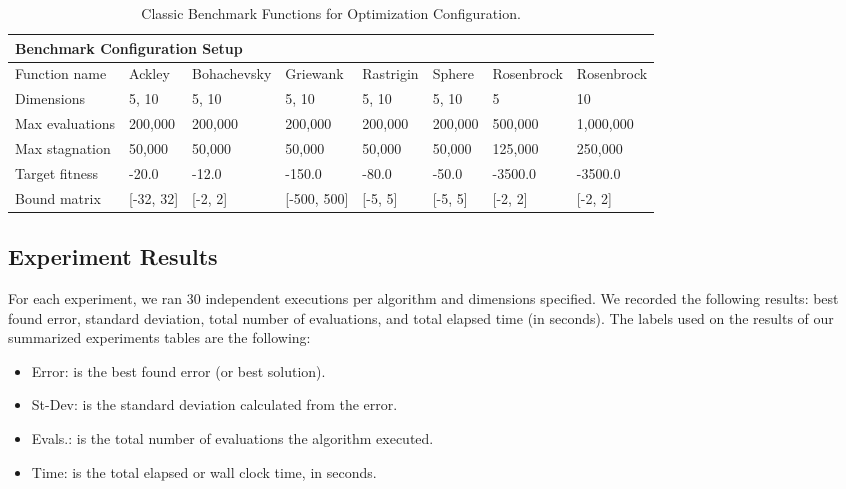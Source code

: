 \documentclass[graybox]{svmult}
\begin{document}
        \begin{table}[]
            \scriptsize
            \centering
            \caption{Classic Benchmark Functions for Optimization Configuration.}\label{tab.benchmark_fun_config}
            \begin{tabular}{@{}llllllll@{}}
            \toprule
            \multicolumn{8}{l}{\textbf{Benchmark Configuration Setup}} \\ \midrule
            Function name & Ackley & Bohachevsky & Griewank & Rastrigin & Sphere & Rosenbrock & Rosenbrock \\
            Dimensions & 5, 10 & 5, 10 & 5, 10 & 5, 10 & 5, 10 & 5 & 10 \\
            Max evaluations & 200,000 & 200,000 & 200,000 & 200,000 & 200,000 & 500,000 & 1,000,000 \\
            Max stagnation & 50,000 & 50,000 & 50,000 & 50,000 & 50,000 & 125,000 & 250,000 \\
            Target fitness & -20.0 & -12.0 & -150.0 & -80.0 & -50.0 & -3500.0 & -3500.0 \\
            Bound matrix & {[}-32, 32{]} & {[}-2, 2{]} & {[}-500, 500{]} & {[}-5, 5{]} & {[}-5, 5{]} & {[}-2, 2{]} & {[}-2, 2{]} \\ \bottomrule
            \end{tabular}
            \end{table}
        
        \FloatBarrier


    \subsection{Experiment Results}

        For each experiment, we ran 30 independent executions per algorithm and
        dimensions specified. We recorded the following results: best found error,
        standard deviation, total number of evaluations, and total elapsed time (in
        seconds). The labels used on the results of our summarized experiments tables
        are the following:

        \begin{itemize}
            \item   Error:       is the best found error (or best solution).
            \item   St-Dev:      is the standard deviation calculated from the error. 
            \item   Evals.:      is the total number of evaluations the algorithm executed.
            \item   Time:        is the total elapsed or wall clock time, in seconds. 
        \end{itemize}
\end{document}
